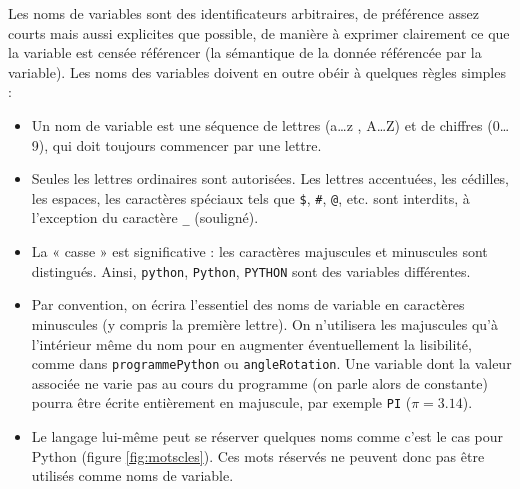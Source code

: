 Les noms de variables sont des identificateurs arbitraires, de préférence assez courts mais aussi 
explicites que possible, de manière à exprimer clairement ce que la variable est censée 
référencer (la sémantique de la donnée référencée par la variable). 
Les noms des variables doivent en outre obéir à quelques règles simples :
\begin{itemize}
\item Un nom de variable est une séquence de lettres (a\ldots  z , A\ldots  Z) et de chiffres (0\ldots  9), qui
      	doit toujours commencer par une lettre.
\item Seules les lettres ordinaires sont autorisées. Les lettres accentuées, les cédilles, les espaces, les
      	caractères spéciaux tels que {\tt \$}, {\tt \#}, {\tt @}, etc. sont interdits, 
      	à l'exception du caractère {\tt \_} (souligné).
\item La « casse » est significative : les caractères majuscules et minuscules sont distingués. Ainsi,
      	{\tt python}, {\tt Python}, {\tt PYTHON} sont des variables différentes. 
\item Par convention, on écrira l'essentiel des noms de variable en caractères minuscules (y compris la
	première lettre). On n'utilisera les majuscules qu'à l'intérieur même du nom  
	pour en augmenter éventuellement la lisibilité, comme dans {\tt programmePython} ou
	{\tt angleRotation}.
	Une variable dont la valeur associée ne varie pas au cours du programme (on parle alors de constante)
	pourra être écrite entièrement en majuscule, par exemple {\tt PI} ($\pi = 3.14$).
\item Le langage lui-même peut se réserver quelques noms comme c'est le cas pour {\sc Python} 
	(figure \ref{fig:motscles}). Ces mots réservés ne peuvent donc pas être
	utilisés comme noms de variable.
\end{itemize}


